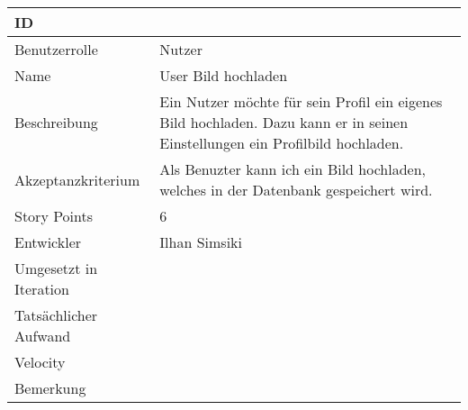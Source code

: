 \begin{tabularx}{\textwidth}{|p{}|X|}
	\hline
	ID & \\
	\hline
	Benutzerrolle & Nutzer\\
	\hline
	Name & User Bild hochladen\\
	\hline
	Beschreibung & Ein Nutzer möchte für sein Profil ein eigenes Bild hochladen. Dazu kann er in seinen Einstellungen ein Profilbild hochladen.\\
	\hline
	Akzeptanzkriterium & Als Benuzter kann ich ein Bild hochladen, welches in der Datenbank gespeichert wird.\\
	\hline
	Story Points & 6\\
	\hline
	Entwickler & Ilhan Simsiki\\
	\hline
	Umgesetzt in Iteration & \\
	\hline
	Tatsächlicher Aufwand & \\
	\hline
	Velocity & \\
	\hline
	Bemerkung & \\
	\hline
\end{tabularx}
\vspace{20pt}
